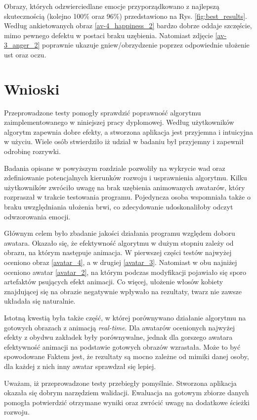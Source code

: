 Obrazy, których odzwierciedlane emocje przyporządkowano z najlepszą skutecznością (kolejno 100\% oraz 96\%) przedstawiono na Rys. \ref{fig:best_results}. Według ankietowanych obraz \ref{av-4_happiness_2} bardzo dobrze oddaje szczęście, mimo pewnego defektu w postaci braku uzębienia. Natomiast zdjęcie \ref{av-3_anger_2} poprawnie ukazuje gniew/obrzydzenie poprzez odpowiednie ułożenie ust oraz oczu. 


\section{Wnioski}
Przeprowadzone testy pomogły sprawdzić poprawność algorytmu zaimplementowanego w niniejszej pracy dyplomowej. Według użytkowników algorytm zapewnia dobre efekty, a stworzona aplikacja jest przyjemna i intuicyjna w użyciu. Wiele osób stwierdziło iż udział w badaniu był przyjemny i zapewnił odrobinę rozrywki.

Badania opisane w powyższym rozdziale pozwoliły na wykrycie wad oraz zdefiniowanie potencjalnych kierunków rozwoju i usprawnienia algorytmu. Kilku użytkowników zwróciło uwagę na brak uzębienia animowanych awatarów, który rozpraszał w trakcie testowania programu. Pojedyncza osoba wspomniała także o braku uwzględniania ułożenia brwi, co zdecydowanie udoskonaliłoby odczyt odwzorowania emocji.

Głównym celem było zbadanie jakości działania programu względem doboru awatara. Okazało się, że efektywność algorytmu w dużym stopniu zależy od obrazu, na którym następuje animacja. W pierwszej części testów najwyżej oceniono obraz \ref{avatar_4}, a w drugiej \ref{avatar_3}. Natomiast w obu najniżej oceniono awatar \ref{avatar_2}, na którym podczas modyfikacji pojawiało się sporo artefaktów psujących efekt animacji. Co więcej, ułożenie włosów kobiety znajdującej się na obrazie negatywnie wpływało na rezultaty, twarz nie zawsze układała się naturalnie. 

Istotną kwestią była także część, w której porównywano działanie algorytmu na gotowych obrazach z animacją \textit{real-time}. Dla awatarów ocenionych najwyżej efekty z obydwu zakładek były porównywalne, jednak dla gorszego awatara efektywność animacji na podstawie gotowych obrazów wzrastała. Może to być spowodowane Faktem jest, że rezultaty są mocno zależne od mimiki danej osoby, dla każdej z nich inny awatar sprawdzał się lepiej. 

Uważam, iż przeprowadzone testy przebiegły pomyślnie. Stworzona aplikacja okazała się dobrym narzędziem walidacji. Ewaluacja na gotowym zbiorze danych pomogła potwierdzić otrzymane wyniki oraz zwrócić uwagę na dodatkowe ścieżki rozwoju.



